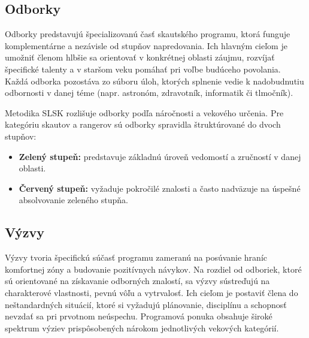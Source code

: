 \subsection{Odborky}
Odborky predstavujú špecializovanú časť skautského programu, ktorá funguje komplementárne a nezávisle od stupňov napredovania. Ich hlavným cieľom je umožniť členom hlbšie sa orientovať v konkrétnej oblasti záujmu, rozvíjať špecifické talenty a v staršom veku pomáhať pri voľbe budúceho povolania. Každá odborka pozostáva zo súboru úloh, ktorých splnenie vedie k nadobudnutiu odbornosti v danej téme (napr. astronóm, zdravotník, informatik či tlmočník).

Metodika SLSK rozlišuje odborky podľa náročnosti a vekového určenia. Pre kategóriu skautov a rangerov sú odborky spravidla štruktúrované do dvoch stupňov:
\begin{itemize}
\item \textbf{Zelený stupeň:} predstavuje základnú úroveň vedomostí a zručností v danej oblasti.
\item \textbf{Červený stupeň:} vyžaduje pokročilé znalosti a často nadväzuje na úspešné absolvovanie zeleného stupňa.
\end{itemize}

\subsection{Výzvy}
Výzvy tvoria špecifickú súčasť programu zameranú na posúvanie hraníc komfortnej zóny a budovanie pozitívnych návykov. Na rozdiel od odboriek, ktoré sú orientované na získavanie odborných znalostí, sa výzvy sústreďujú na charakterové vlastnosti, pevnú vôľu a vytrvalosť. Ich cieľom je postaviť člena do neštandardných situácií, ktoré si vyžadujú plánovanie, disciplínu a schopnosť nevzdať sa pri prvotnom neúspechu.
Programová ponuka obsahuje široké spektrum výziev prispôsobených nárokom jednotlivých vekových kategórií.\cite{noauthor_vyzvy_2025}


